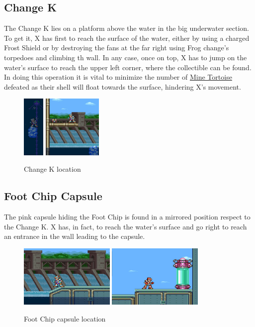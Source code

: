 \subsection{Change K}
The Change K lies on a platform above the water in the big underwater section. To get it, X has first to reach the surface of the water, either by using a charged Frost Shield or by destroying the fans at the far right using Frog change's torpedoes and climbing th wall. In any case, once on top, X has to jump on the water's surface to reach the upper left corner, where the collectible can be found. In doing this operation it is vital to minimize the number of \hyperlink{enem:Mine_Tortoise}{Mine Tortoise} defeated as their shell will float towards the surface, hindering X's movement.
\begin{figure}[htp]
	\centering
	\includegraphics[height=3cm]{figures/X3/Toxic_seahorse/underwater.jpg}
	\includegraphics[height=3cm]{figures/X3/Toxic_seahorse/kanga.jpg}
	\caption{Change K location}
\end{figure}

\subsection{Foot Chip Capsule}
The pink capsule hiding the Foot Chip is found in a mirrored position respect to the Change K. X has, in fact, to reach the water's surface and go right to reach an entrance in the wall leading to the capsule.
\begin{figure}[htp]
	\centering
	\includegraphics[height=3cm]{figures/X3/Toxic_seahorse/Armor_1.png}
	\includegraphics[height=3cm]{figures/X3/Toxic_seahorse/Armor_2.png}
	\caption{Foot Chip capsule location}
\end{figure}

